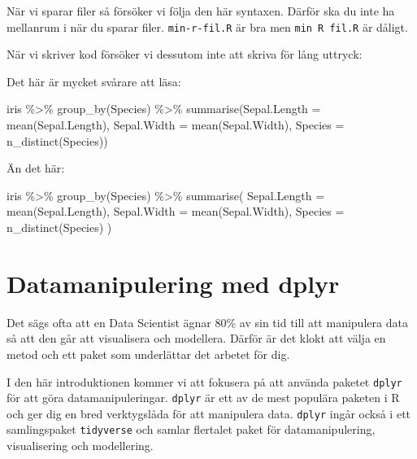 \documentclass[
]{book}
\newenvironment{Shaded}{\begin{snugshade}}{\end{snugshade}}
\newcommand{\AttributeTok}[1]{\textcolor[rgb]{0.77,0.63,0.00}{#1}}
\newcommand{\FunctionTok}[1]{\textcolor[rgb]{0.00,0.00,0.00}{#1}}
\newcommand{\NormalTok}[1]{#1}
\newcommand{\SpecialCharTok}[1]{\textcolor[rgb]{0.00,0.00,0.00}{#1}}
\begin{document}
När vi sparar filer så försöker vi följa den här syntaxen. Därför ska du inte ha mellanrum i när du sparar filer. \texttt{min-r-fil.R} är bra men \texttt{min\ R\ fil.R} är dåligt.

När vi skriver kod försöker vi dessutom inte att skriva för lång uttryck:

Det här är mycket svårare att läsa:

\begin{Shaded}
\begin{Highlighting}[]
\NormalTok{iris }\SpecialCharTok{\%\textgreater{}\%} \FunctionTok{group\_by}\NormalTok{(Species) }\SpecialCharTok{\%\textgreater{}\%} \FunctionTok{summarise}\NormalTok{(}\AttributeTok{Sepal.Length =} \FunctionTok{mean}\NormalTok{(Sepal.Length), }\AttributeTok{Sepal.Width =} \FunctionTok{mean}\NormalTok{(Sepal.Width), }\AttributeTok{Species =} \FunctionTok{n\_distinct}\NormalTok{(Species))}
\end{Highlighting}
\end{Shaded}

Än det här:

\begin{Shaded}
\begin{Highlighting}[]
\NormalTok{iris }\SpecialCharTok{\%\textgreater{}\%}
  \FunctionTok{group\_by}\NormalTok{(Species) }\SpecialCharTok{\%\textgreater{}\%}
  \FunctionTok{summarise}\NormalTok{(}
    \AttributeTok{Sepal.Length =} \FunctionTok{mean}\NormalTok{(Sepal.Length),}
    \AttributeTok{Sepal.Width =} \FunctionTok{mean}\NormalTok{(Sepal.Width),}
    \AttributeTok{Species =} \FunctionTok{n\_distinct}\NormalTok{(Species)}
\NormalTok{  ) }
\end{Highlighting}
\end{Shaded}

\hypertarget{databearbetning}{%
\chapter{Datamanipulering med dplyr}\label{databearbetning}}

Det sägs ofta att en Data Scientist ägnar 80\% av sin tid till att manipulera data så att den går att visualisera och modellera. Därför är det klokt att välja en metod och ett paket som underlättar det arbetet för dig.

I den här introduktionen kommer vi att fokusera på att använda paketet \texttt{dplyr} för att göra datamanipuleringar. \texttt{dplyr} är ett av de mest populära paketen i R och ger dig en bred verktygslåda för att manipulera data. \texttt{dplyr} ingår också i ett samlingspaket \texttt{tidyverse} och samlar flertalet paket för datamanipulering, visualisering och modellering.
\end{document}
